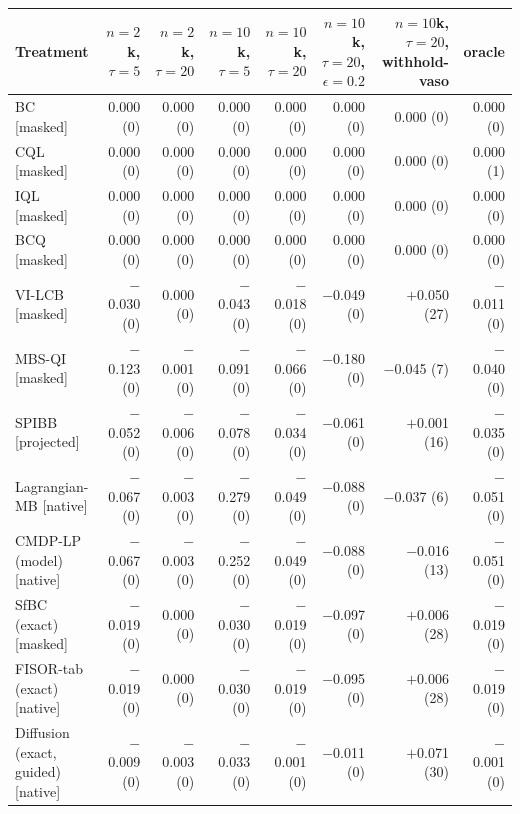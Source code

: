 \begin{tabular}{lrrrrrrr}
\toprule
Treatment & $n{=}2$k, $\tau{=}5$ & $n{=}2$k, $\tau{=}20$ & $n{=}10$k, $\tau{=}5$ & $n{=}10$k, $\tau{=}20$ & $n{=}10$k, $\tau{=}20$, $\epsilon{=}0.2$ & $n{=}10$k, $\tau{=}20$, withhold-vaso & oracle \\
\midrule
BC [masked] & 0.000 (0) & 0.000 (0) & 0.000 (0) & 0.000 (0) & 0.000 (0) & 0.000 (0) & 0.000 (0) \\
CQL [masked] & 0.000 (0) & 0.000 (0) & 0.000 (0) & 0.000 (0) & 0.000 (0) & 0.000 (0) & 0.000 (1) \\
IQL [masked] & 0.000 (0) & 0.000 (0) & 0.000 (0) & 0.000 (0) & 0.000 (0) & 0.000 (0) & 0.000 (0) \\
BCQ [masked] & 0.000 (0) & 0.000 (0) & 0.000 (0) & 0.000 (0) & 0.000 (0) & 0.000 (0) & 0.000 (0) \\
VI-LCB [masked] & $-$0.030 (0) & 0.000 (0) & $-$0.043 (0) & $-$0.018 (0) & $-$0.049 (0) & $+$0.050 (27) & $-$0.011 (0) \\
MBS-QI [masked] & $-$0.123 (0) & $-$0.001 (0) & $-$0.091 (0) & $-$0.066 (0) & $-$0.180 (0) & $-$0.045 (7) & $-$0.040 (0) \\
SPIBB [projected] & $-$0.052 (0) & $-$0.006 (0) & $-$0.078 (0) & $-$0.034 (0) & $-$0.061 (0) & $+$0.001 (16) & $-$0.035 (0) \\
Lagrangian-MB [native] & $-$0.067 (0) & $-$0.003 (0) & $-$0.279 (0) & $-$0.049 (0) & $-$0.088 (0) & $-$0.037 (6) & $-$0.051 (0) \\
CMDP-LP (model) [native] & $-$0.067 (0) & $-$0.003 (0) & $-$0.252 (0) & $-$0.049 (0) & $-$0.088 (0) & $-$0.016 (13) & $-$0.051 (0) \\
SfBC (exact) [masked] & $-$0.019 (0) & 0.000 (0) & $-$0.030 (0) & $-$0.019 (0) & $-$0.097 (0) & $+$0.006 (28) & $-$0.019 (0) \\
FISOR-tab (exact) [native] & $-$0.019 (0) & 0.000 (0) & $-$0.030 (0) & $-$0.019 (0) & $-$0.095 (0) & $+$0.006 (28) & $-$0.019 (0) \\
Diffusion (exact, guided) [native] & $-$0.009 (0) & $-$0.003 (0) & $-$0.033 (0) & $-$0.001 (0) & $-$0.011 (0) & $+$0.071 (30) & $-$0.001 (0) \\
\bottomrule
\end{tabular}
